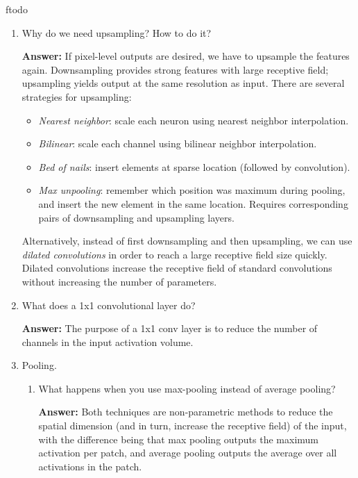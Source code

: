 ƒtodo\documentclass{article}
\newenvironment{QandA}{\begin{enumerate}[label=\arabic*.]}{\end{enumerate}}
\newenvironment{InnerQandA}{\begin{enumerate}[label=\roman*.]}{\end{enumerate}}
\newenvironment{answer}{\par\normalfont \textbf{Answer:}}{}
\begin{document}
\begin{QandA}
    \item Why do we need upsampling? How to do it?
    \begin{answer}
        If pixel-level outputs are desired, we have to upsample the features again. Downsampling provides strong features with large receptive field; upsampling yields output at the same resolution as input. There are several strategies for upsampling:
        \begin{itemize}
            \item \textit{Nearest neighbor}: scale each neuron using nearest neighbor interpolation.
            \item \textit{Bilinear}:  scale each channel using bilinear neighbor interpolation.
            \item \textit{Bed of nails}: insert elements at sparse location (followed by convolution).
            \item \textit{Max unpooling}: remember which position was maximum during pooling, and insert the new element in the same location. Requires corresponding pairs of downsampling and upsampling layers.
        \end{itemize}
        Alternatively, instead of first downsampling and then upsampling, we can use \textit{dilated convolutions} in order to reach a large receptive field size quickly. Dilated convolutions increase the receptive field of standard convolutions without increasing the number of parameters.
    \end{answer}

    \item What does a 1x1 convolutional layer do?
    \begin{answer}
        The purpose of a 1x1 conv layer is to reduce the number of channels in the input activation volume. 
    \end{answer}

    \item Pooling.
    \begin{InnerQandA}
        \item What happens when you use max-pooling instead of average pooling?
        \begin{answer}
            Both techniques are non-parametric methods to reduce the spatial dimension (and in turn, increase the receptive field) of the input, with the difference being that max pooling outputs the maximum activation per patch, and average pooling outputs the average over all activations in the patch. 
        \end{answer}


\end{InnerQandA}
\end{QandA}
\end{document}
